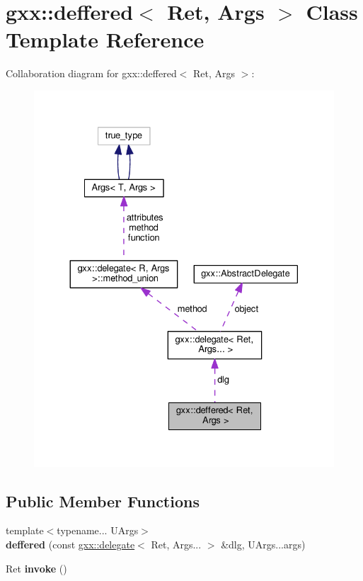 \hypertarget{classgxx_1_1deffered}{}\section{gxx\+:\+:deffered$<$ Ret, Args $>$ Class Template Reference}
\label{classgxx_1_1deffered}


Collaboration diagram for gxx\+:\+:deffered$<$ Ret, Args $>$\+:
\nopagebreak
\begin{figure}[H]
\begin{center}
\leavevmode
\includegraphics[width=330pt]{classgxx_1_1deffered__coll__graph}
\end{center}
\end{figure}
\subsection*{Public Member Functions}
\begin{DoxyCompactItemize}
\item 
{\footnotesize template$<$typename... U\+Args$>$ }\\{\bfseries deffered} (const \hyperlink{classgxx_1_1delegate}{gxx\+::delegate}$<$ Ret, Args... $>$ \&dlg, U\+Args...\+args)\hypertarget{classgxx_1_1deffered_ab813cdb2f51d78d695c1f4f807225d59}{}\label{classgxx_1_1deffered_ab813cdb2f51d78d695c1f4f807225d59}

\item 
Ret {\bfseries invoke} ()\hypertarget{classgxx_1_1deffered_a1bea81d7b89cf185a4e465589d2f7744}{}\label{classgxx_1_1deffered_a1bea81d7b89cf185a4e465589d2f7744}

\end{DoxyCompactItemize}
